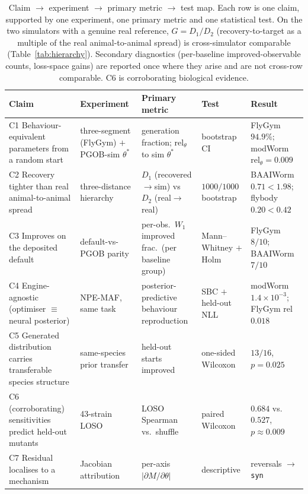 \documentclass[11pt]{article}
\begin{document}
\begin{table}[H]
\centering\scriptsize
\caption{Claim $\to$ experiment $\to$ primary metric $\to$ test map. Each row is one claim, supported by one experiment, one primary metric and one statistical test. On the two simulators with a genuine real reference, $G{=}D_1/D_2$ (recovery-to-target as a multiple of the real animal-to-animal spread) is cross-simulator comparable (Table~\ref{tab:hierarchy}). Secondary diagnostics (per-baseline improved-observable counts, loss-space gains) are reported once where they arise and are not cross-row comparable. C6 is corroborating biological evidence.}
\label{tab:claimmap}
\begin{tabular}{p{3.1cm}p{2.7cm}p{2.9cm}p{1.9cm}p{2.5cm}}\toprule
Claim & Experiment & Primary metric & Test & Result \\\midrule
C1 Behaviour-equivalent parameters from a random start & three-segment (FlyGym) $+$ PGOB-sim $\theta^*$ & generation fraction; $\mathrm{rel}_\theta$ to sim $\theta^*$ & bootstrap CI & FlyGym $94.9\%$; modWorm $\mathrm{rel}_\theta{=}0.009$ \\
C2 Recovery tighter than real animal-to-animal spread & three-distance hierarchy & $D_1$ (recovered$\to$sim) vs $D_2$ (real$\to$real) & $1000/1000$ bootstrap & BAAIWorm $0.71{<}1.98$; flybody $0.20{<}0.42$ \\
C3 Improves on the deposited default & default-vs-PGOB parity & per-obs.\ $W_1$ improved frac.\ (per baseline group) & Mann--Whitney $+$ Holm & FlyGym $8/10$; BAAIWorm $7/10$ \\
C4 Engine-agnostic (optimiser $\equiv$ neural posterior) & NPE-MAF, same task & posterior-predictive behaviour reproduction & SBC $+$ held-out NLL & modWorm $1.4{\times}10^{-3}$; FlyGym rel $0.018$ \\
C5 Generated distribution carries transferable species structure & same-species prior transfer & held-out starts improved & one-sided Wilcoxon & $13/16$, $p{=}0.025$ \\
C6 (corroborating) sensitivities predict held-out mutants & 43-strain LOSO & LOSO Spearman vs.\ shuffle & paired Wilcoxon & $0.684$ vs.\ $0.527$, $p{\approx}0.009$ \\
C7 Residual localises to a mechanism & Jacobian attribution & per-axis $|\partial M/\partial\theta|$ & descriptive & reversals $\to$ \texttt{syn} \\\bottomrule
\end{tabular}
\end{table}
\end{document}

